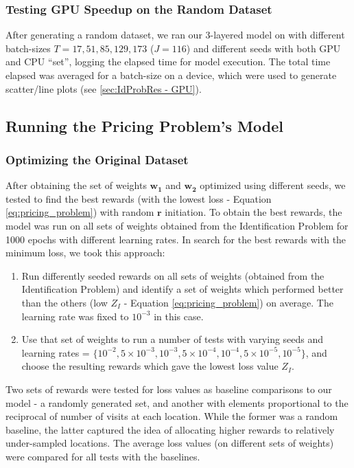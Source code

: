 \documentclass[12pt]{article}
\newcommand{\vect}[1]{\mathbf{#1}}  %
\newcommand{\matr}[1]{\mathbf{#1}}  %
\begin{document}
    \subsubsection{Testing GPU Speedup on the Random Dataset} \label{sec:Identification Problem-Testing GPU Speedup on the Random Dataset}
    After generating a random dataset, we ran our 3-layered model on with different batch-sizes $T = 17, 51, 85, 129, 173$ ($J = 116$) and different seeds with both GPU and CPU ``set'', logging the elapsed time for model execution. The total time elapsed was averaged for a batch-size on a device, which were used to generate scatter/line plots (see \cref{sec:IdProbRes - GPU}).
    
    \subsection{Running the Pricing Problem's Model} \label{sec:Running the Pricing Problem's Model}
    \subsubsection{Optimizing the Original Dataset} \label{sec:Pricing Problem-Optimizing the Original Dataset}
    After obtaining the set of weights $\matr{w_1}$ and $\matr{w_2}$ optimized using different seeds, we tested to find the best rewards (with the lowest loss - Equation \ref{eq:pricing_problem}) with random $\vect{r}$ initiation. To obtain the best rewards, the model was run on all sets of weights obtained from the Identification Problem for 1000 epochs with different learning rates. In search for the best rewards with the minimum loss, we took this approach:
    \begin{enumerate}
        \item Run differently seeded rewards on all sets of weights (obtained from the Identification Problem) and identify a set of weights which performed better than the others (low $Z_I$ - Equation \ref{eq:pricing_problem}) on average. The learning rate was fixed to $10^{-3}$ in this case.
        \item Use that set of weights to run a number of tests with varying seeds and learning rates = $\{10^{-2}, 5 \times 10^{-3}, 10^{-3}, 5 \times 10^{-4}, 10^{-4}, 5 \times 10^{-5}, 10^{-5}\}$, and choose the resulting rewards which gave the lowest loss value $Z_I$.
    \end{enumerate}
    Two sets of rewards were tested for loss values as baseline comparisons to our model - a randomly generated set, and another with elements proportional to the reciprocal of number of visits at each location. While the former was a random baseline, the latter captured the idea of allocating higher rewards to relatively under-sampled locations. The average loss values (on different sets of weights) were compared for all tests with the baselines.
    
\end{document}
